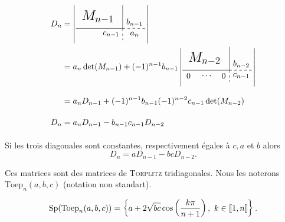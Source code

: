 \newcommand{\dettrignmoinsun}{
\left|\begin{gathered}
    \tikzpicture[every node/.style={anchor=south west}]
        \node[minimum width=1.5cm,minimum height=1cm] at (0.125,0.5) {\LARGE $M_{n-2}$};
        \node[minimum width=0.5cm,minimum height=0.5cm] at (0,0) {$0$};
        \node[minimum width=0.5cm,minimum height=0.5cm] at (0.7,0) {$\cdots$};
        \node[minimum width=0.5cm,minimum height=0.5cm] at (1.5,0) {$0$};
        \node[minimum width=1cm,minimum height=0.5cm] at (2,0) {$c_{n-1}$};
        \node[minimum width=1cm,minimum height=1cm] at (2,0.25) {$b_{n-2}$};
        \draw (0,0.5) -- (2,0.5);
        \draw (2,0.5) -- (2,1.5);
        \draw[dashed] (2,0.5) -- (3,0.5);
        \draw[dashed] (2,0.5) -- (2,0);
    \endtikzpicture
    \end{gathered}\right|
}

\begin{preuve}
    \begin{align*}
        D_n &= \dettrign \\
            &= a_n \det(M_{n-1}) + (-1)^{n-1} b_{n-1} \dettrignmoinsun \\
            &= a_n D_{n-1} + (-1)^{n-1} b_{n-1} (-1)^{n-2} c_{n-1} \det(M_{n-2}) \\
        D_n &= a_n D_{n-1} - b_{n-1} c_{n-1} D_{n-2}
    \end{align*}
\end{preuve}

\begin{corol} \label{relation_det_toep_trig}
    Si les trois diagonales sont constantes, respectivement égales à $c, a$ et $b$ alors
    $$D_n = aD_{n-1} - bc D_{n-2}.$$
\end{corol}


Ces matrices sont des matrices de \textsc{Toeplitz} tridiagonales. Nous les noterons $\mathrm{Toep}_n (a,b,c)$ (notation non standart). 

\begin{prop}
    $$\mathrm{Sp}(\mathrm{Toep}_n(a,b,c)) = \left \{ a + 2 \sqrt{bc} \cos \left( \frac{k \pi}{n+1} \right) ,\ k \in \llbracket 1, n \rrbracket \right \}.$$
\end{prop}

